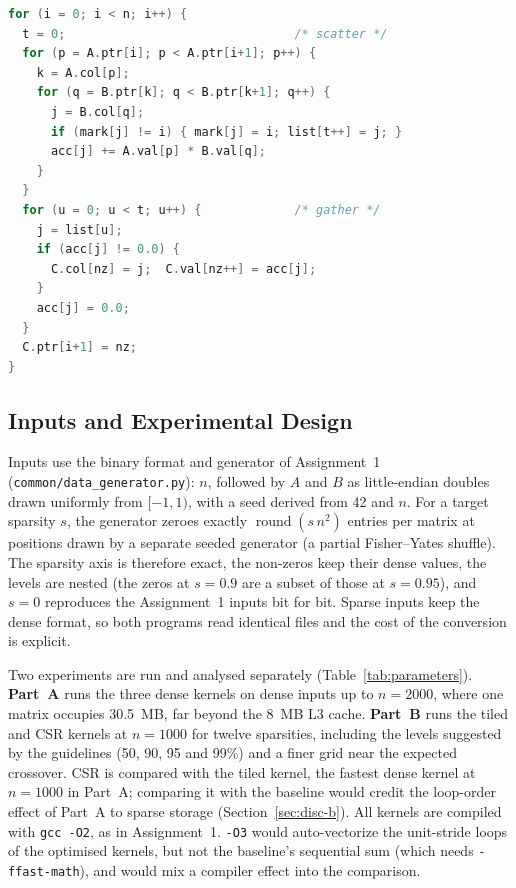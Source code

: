 \documentclass[conference,a4paper]{IEEEtran}
\newcommand{\code}[1]{\texttt{#1}}
\begin{document}
\begin{lstlisting}[language=C, float=t, caption={Gustavson's algorithm with a sparse accumulator (simplified). \code{acc} starts at 0, \code{mark} at $-1$.}, label=lst:csr, captionpos=b]
for (i = 0; i < n; i++) {
  t = 0;                                /* scatter */
  for (p = A.ptr[i]; p < A.ptr[i+1]; p++) {
    k = A.col[p];
    for (q = B.ptr[k]; q < B.ptr[k+1]; q++) {
      j = B.col[q];
      if (mark[j] != i) { mark[j] = i; list[t++] = j; }
      acc[j] += A.val[p] * B.val[q];
    }
  }
  for (u = 0; u < t; u++) {             /* gather */
    j = list[u];
    if (acc[j] != 0.0) {
      C.col[nz] = j;  C.val[nz++] = acc[j];
    }
    acc[j] = 0.0;
  }
  C.ptr[i+1] = nz;
}
\end{lstlisting}

\subsection{Inputs and Experimental Design}
\label{sec:design}
Inputs use the binary format and generator of Assignment~1
(\code{common/\allowbreak data\_\allowbreak generator.py}): $n$, followed by $A$
and $B$ as little-endian doubles drawn uniformly from $[-1, 1)$, with a seed
derived from 42 and $n$. For a target sparsity $s$, the generator zeroes exactly
$\operatorname{round}(s\, n^2)$ entries per matrix at positions drawn by a
separate seeded generator (a partial Fisher--Yates shuffle). The sparsity axis
is therefore exact, the non-zeros keep their dense values, the levels are
nested (the zeros at $s = 0.9$ are a subset of those at $s = 0.95$), and $s = 0$
reproduces the Assignment~1 inputs bit for bit. Sparse inputs keep the dense
format, so both programs read identical files and the cost of the conversion is
explicit.

Two experiments are run and analysed separately (Table~\ref{tab:parameters}).
\textbf{Part~A} runs the three dense kernels on dense inputs up to $n = 2000$,
where one matrix occupies 30.5~MB, far beyond the 8~MB L3 cache. \textbf{Part~B}
runs the tiled and CSR kernels at $n = 1000$ for twelve sparsities, including
the levels suggested by the guidelines (50, 90, 95 and 99\%) and a finer grid
near the expected crossover. CSR is compared with the tiled kernel, the fastest
dense kernel at $n = 1000$ in Part~A; comparing it with the baseline would
credit the loop-order effect of Part~A to sparse storage
(Section~\ref{sec:disc-b}). All kernels are compiled with \code{gcc -O2}, as in
Assignment~1. \code{-O3} would auto-vectorize the unit-stride loops of the
optimised kernels, but not the baseline's sequential sum (which needs
\code{-ffast-math}), and would mix a compiler effect into the comparison.
\end{document}
